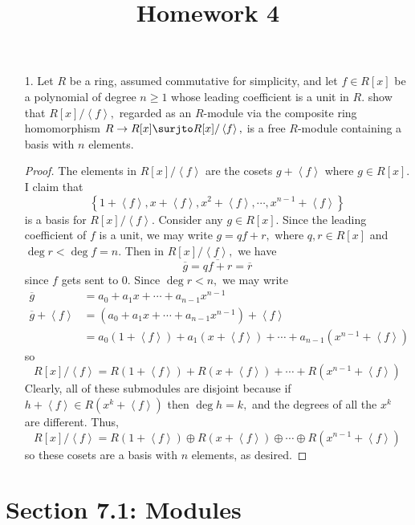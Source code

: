\documentclass{article}
\begin{document}
\title{Homework 4}
\maketitle
\thispagestyle{fancy}

\begin{itemize}
	\item[1.] Let $R$ be a ring, assumed commutative for simplicity, and let $f\in R[x]$ be a polynomial of degree $n\ge 1$ whose leading coefficient is a unit in $R.$ show that $R[x]/\left< f\right>,$ regarded as an $R$-module via the composite ring homomorphism $R\to R[x]\surjto R[x]/\left< f\right>,$ is a free $R$-module containing a basis with $n$ elements.
		\begin{proof}
			The elements in $R[x]/\left< f\right>$ are the cosets $g+\left< f\right>$ where $g\in R[x].$ I claim that 
			\[\left\{ 1+\left< f\right>, x+\left< f\right>, x^2+\left< f\right>, \cdots, x^{n-1}+\left< f\right> \right\}\]
			is a basis for $R[x]/\left< f\right>.$ Consider any $g\in R[x].$ Since the leading coefficient of $f$ is a unit, we may write $g=qf+r,$ where $q, r\in R[x]$ and $\deg r<\deg f=n.$ Then in $R[x]/\left< f\right>,$ we have
			\[\overline{g}=\overline{qf+r}=\overline{r}\]
			since $f$ gets sent to 0. Since $\deg r<n,$ we may write
			\begin{align*}
				\overline{g}&=a_0+a_1x+\cdots+a_{n-1}x^{n-1} \\
				\overline{g}+\left< f\right> &= (a_0+a_1x+\cdots+a_{n-1}x^{n-1}) + \left< f\right> \\ 
				&= a_0(1+\left< f\right>) + a_1(x+\left< f\right>) + \cdots + a_{n-1} (x^{n-1}+\left< f\right>)
			\end{align*}
			so
			\[R[x]/\left< f\right> = R(1+\left< f\right>) + R(x+\left< f\right>) + \cdots + R(x^{n-1}+\left< f\right>)\]
			Clearly, all of these submodules are disjoint because if $h+\left< f\right>\in R(x^{k}+\left< f\right>)$ then $\deg h = k,$ and the degrees of all the $x^k$ are different. Thus, 
			\[R[x]/\left< f\right> = R(1+\left< f\right>) \oplus R(x+\left< f\right>) \oplus \cdots \oplus R(x^{n-1}+\left< f\right>)\]
			so these cosets are a basis with $n$ elements, as desired.
		\end{proof}

\end{itemize}

\section*{Section 7.1: Modules}
\end{document}
